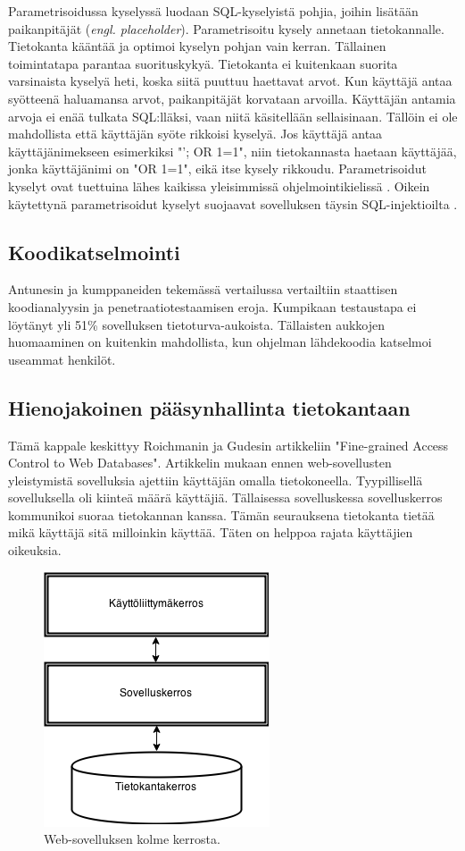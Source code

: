 \documentclass[finnish]{tktltiki2}
\theoremstyle{definition}
\theoremstyle{remark}
\begin{document}
		 Parametrisoidussa kyselyssä luodaan SQL-kyselyistä pohjia, joihin lisätään paikanpitäjät (\textit{engl. placeholder}). Parametrisoitu kysely annetaan tietokannalle. Tietokanta kääntää ja optimoi kyselyn pohjan vain kerran. Tällainen toimintatapa parantaa suorituskykyä. Tietokanta ei kuitenkaan suorita varsinaista kyselyä heti, koska siitä puuttuu haettavat arvot. Kun käyttäjä antaa syötteenä haluamansa arvot, paikanpitäjät korvataan arvoilla. Käyttäjän antamia arvoja ei enää tulkata SQL:lläksi, vaan niitä käsitellään sellaisinaan. Tällöin ei ole mahdollista että käyttäjän syöte rikkoisi kyselyä. Jos käyttäjä antaa käyttäjänimekseen esimerkiksi  "'; OR 1=1", niin tietokannasta haetaan käyttäjää, jonka käyttäjänimi on "OR 1=1", eikä itse kysely rikkoudu.
		Parametrisoidut kyselyt ovat tuettuina lähes kaikissa yleisimmissä ohjelmointikielissä \cite{java}. Oikein käytettynä parametrisoidut kyselyt suojaavat sovelluksen täysin SQL-injektioilta \cite{prepared}.
		
		\subsection{Koodikatselmointi}
		Antunesin ja kumppaneiden tekemässä vertailussa \cite{vertailu} vertailtiin staattisen koodianalyysin ja penetraatiotestaamisen eroja. Kumpikaan testaustapa ei löytänyt yli 51\% sovelluksen tietoturva-aukoista. Tällaisten aukkojen huomaaminen on kuitenkin mahdollista, kun ohjelman lähdekoodia katselmoi useammat henkilöt.
		
		\subsection{Hienojakoinen pääsynhallinta tietokantaan}
		Tämä kappale keskittyy Roichmanin ja Gudesin artikkeliin "Fine-grained Access Control to Web Databases"\space\cite{access}. Artikkelin mukaan ennen web-sovellusten yleistymistä sovelluksia ajettiin käyttäjän omalla tietokoneella. Tyypillisellä sovelluksella oli kiinteä määrä  käyttäjiä. Tällaisessa sovelluskessa sovelluskerros kommunikoi suoraa tietokannan kanssa. Tämän seurauksena tietokanta tietää mikä käyttäjä sitä milloinkin käyttää. Täten on helppoa rajata käyttäjien oikeuksia.
						 \begin{figure}[h]
						 	\centering
						 	\caption{Web-sovelluksen kolme kerrosta.}
						 	\includegraphics[scale=0.55]{kandi2}
						 \end{figure}
				 
\end{document}
